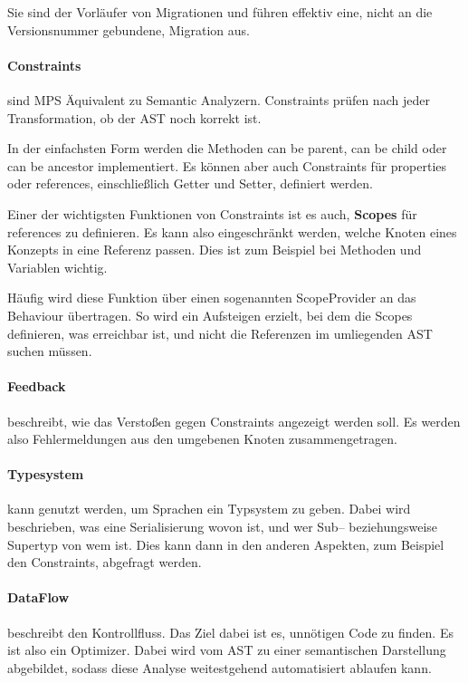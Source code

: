 Sie sind der Vorläufer von Migrationen und führen effektiv eine, nicht an die Versionsnummer gebundene, Migration aus.

\paragraph{Constraints} sind \ac{MPS} Äquivalent zu Semantic Analyzern.
Constraints prüfen nach jeder Transformation, ob der \ac{AST} noch korrekt ist.

In der einfachsten Form werden die Methoden {\ttfamily can be parent}, {\ttfamily can be child} oder {\ttfamily can be ancestor} implementiert.
Es können aber auch Constraints für {\ttfamily properties} oder {\ttfamily references}, einschließlich Getter und Setter, definiert werden.

Einer der wichtigsten Funktionen von Constraints ist es auch, \textbf{Scopes} für {\ttfamily references} zu definieren.
Es kann also eingeschränkt werden, welche Knoten eines Konzepts in eine Referenz passen.
Dies ist zum Beispiel bei Methoden und Variablen wichtig.

Häufig wird diese Funktion über einen sogenannten {\ttfamily ScopeProvider} an das Behaviour übertragen.
So wird ein Aufsteigen erzielt, bei dem die Scopes definieren, was erreichbar ist, und nicht die Referenzen im umliegenden \ac{AST} suchen müssen.

\paragraph{Feedback} beschreibt, wie das Verstoßen gegen Constraints angezeigt werden soll.
Es werden also Fehlermeldungen aus den umgebenen Knoten zusammengetragen.

\paragraph{Typesystem} kann genutzt werden, um Sprachen ein Typsystem zu geben.
Dabei wird beschrieben, was eine Serialisierung wovon ist, und wer Sub-- beziehungsweise Supertyp von wem ist.
Dies kann dann in den anderen Aspekten, zum Beispiel den Constraints, abgefragt werden.

\paragraph{DataFlow} beschreibt den Kontrollfluss.
Das Ziel dabei ist es, unnötigen Code zu finden.
Es ist also ein Optimizer.
Dabei wird vom \ac{AST} zu einer semantischen Darstellung abgebildet, sodass diese Analyse weitestgehend automatisiert ablaufen kann.

